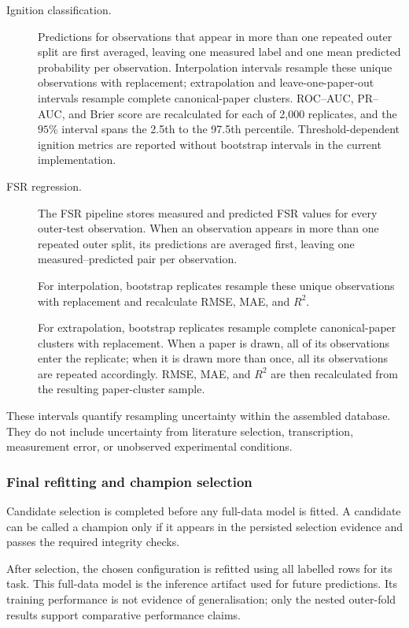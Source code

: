 \begin{description}
  \item[Ignition classification.]
  Predictions for observations that appear in more than one repeated outer split
  are first averaged, leaving one measured label and one mean predicted
  probability per observation. Interpolation intervals resample these unique
  observations with replacement; extrapolation and leave-one-paper-out intervals
  resample complete canonical-paper clusters. ROC--AUC, PR--AUC, and Brier score
  are recalculated for each of 2,000 replicates, and the \(95\%\) interval spans
  the 2.5th to the 97.5th percentile. Threshold-dependent ignition metrics are
  reported without bootstrap intervals in the current implementation.

  \item[FSR regression.]
  The FSR pipeline stores measured and predicted FSR values for every outer-test
  observation. When an observation appears in more than one repeated outer
  split, its predictions are averaged first, leaving one measured--predicted
  pair per observation.

  For interpolation, bootstrap replicates resample these unique observations
  with replacement and recalculate RMSE, MAE, and \(R^2\).

  For extrapolation, bootstrap replicates resample complete canonical-paper
  clusters with replacement. When a paper is drawn, all of its observations
  enter the replicate; when it is drawn more than once, all its observations
  are repeated accordingly. RMSE, MAE, and \(R^2\) are then recalculated from
  the resulting paper-cluster sample.
\end{description}

These intervals quantify resampling uncertainty within the assembled database.
They do not include uncertainty from literature selection, transcription,
measurement error, or unobserved experimental conditions.

\subsubsection{Final refitting and champion selection}

Candidate selection is completed before any full-data model is fitted. A
candidate can be called a champion only if it appears in the persisted selection
evidence and passes the required integrity checks.

After selection, the chosen configuration is refitted using all labelled rows
for its task. This full-data model is the inference artifact used for future
predictions. Its training performance is not evidence of generalisation; only
the nested outer-fold results support comparative performance claims.

